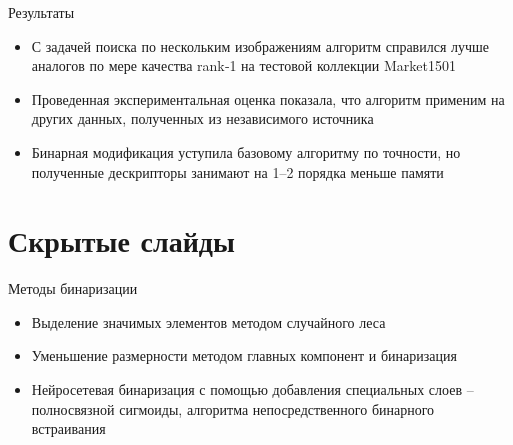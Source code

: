 \documentclass[14pt,mathserif,aspectratio=43]{beamer}
\begin{document}
\begin{frame}{Результаты}
    \begin{itemize}
        \item С задачей поиска по нескольким изображениям алгоритм справился лучше аналогов по мере качества rank‑1 на тестовой коллекции Market1501
        \item Проведенная экспериментальная оценка показала, что алгоритм применим на других данных, полученных из независимого источника
        \item Бинарная модификация уступила базовому алгоритму по точности, но полученные дескрипторы занимают на 1--2 порядка меньше памяти
    \end{itemize}
\end{frame}

\section{Скрытые слайды}

\begin{frame}[label=binary_descriptor]{Методы бинаризации}

    \begin{itemize}
        \item Выделение значимых элементов методом случайного леса
        \item Уменьшение размерности методом главных компонент и бинаризация
        \item Нейросетевая бинаризация с помощью добавления специальных слоев -- полносвязной сигмоиды, алгоритма непосредственного бинарного встраивания
    \end{itemize}
    
    \hyperlink{binary_precision}{}
\end{frame}
\end{document}
